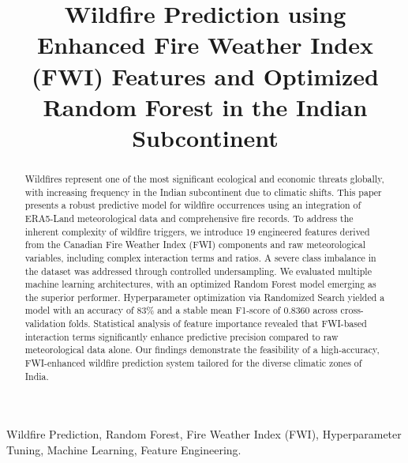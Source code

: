 \documentclass[conference]{IEEEtran}
\begin{document}
\title{Wildfire Prediction using Enhanced Fire Weather Index (FWI) Features and Optimized Random Forest in the Indian Subcontinent}

\author{
\and
{}
}

\maketitle

\begin{abstract}
Wildfires represent one of the most significant ecological and economic threats globally, with increasing frequency in the Indian subcontinent due to climatic shifts. This paper presents a robust predictive model for wildfire occurrences using an integration of ERA5-Land meteorological data and comprehensive fire records. To address the inherent complexity of wildfire triggers, we introduce 19 engineered features derived from the Canadian Fire Weather Index (FWI) components and raw meteorological variables, including complex interaction terms and ratios. A severe class imbalance in the dataset was addressed through controlled undersampling. We evaluated multiple machine learning architectures, with an optimized Random Forest model emerging as the superior performer. Hyperparameter optimization via Randomized Search yielded a model with an accuracy of 83\% and a stable mean F1-score of 0.8360 across cross-validation folds. Statistical analysis of feature importance revealed that FWI-based interaction terms significantly enhance predictive precision compared to raw meteorological data alone. Our findings demonstrate the feasibility of a high-accuracy, FWI-enhanced wildfire prediction system tailored for the diverse climatic zones of India.
\end{abstract}

\begin{IEEEkeywords}
Wildfire Prediction, Random Forest, Fire Weather Index (FWI), Hyperparameter Tuning, Machine Learning, Feature Engineering.
\end{IEEEkeywords}
\end{document}
